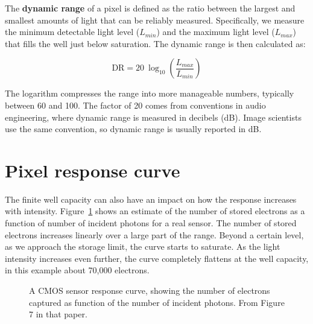\documentclass[
  letterpaper,
]{book}
\begin{document}
The \textbf{dynamic range} of a pixel is defined as the ratio between
the largest and smallest amounts of light that can be reliably measured.
Specifically, we measure the minimum detectable light level
(\(L_{min}\)) and the maximum light level (\(L_{max}\)) that fills the
well just below saturation. The dynamic range is then calculated as:

\[
\text{DR} = 20~\log_{10}\left(\frac{L_{max}}{L_{min}}\right)
\]

The logarithm compresses the range into more manageable numbers,
typically between 60 and 100. The factor of 20 comes from conventions in
audio engineering, where dynamic range is measured in decibels (dB).
Image scientists use the same convention, so dynamic range is usually
reported in dB.

\section{Pixel response curve}\label{sec-pixel-responsecurve}

The finite well capacity can also have an impact on how the response
increases with intensity. Figure~\ref{fig-sensor-linearity} shows an
estimate of the number of stored electrons as a function of number of
incident photons for a real sensor. The number of stored electrons
increases linearly over a large part of the range. Beyond a certain
level, as we approach the storage limit, the curve starts to saturate.
As the light intensity increases even further, the curve completely
flattens at the well capacity, in this example about 70,000 electrons.

\begin{figure}


\caption{\label{fig-sensor-linearity}A CMOS sensor response curve,
showing the number of electrons captured as function of the number of
incident photons. From Figure 7 in that paper.}

\end{figure}%
\end{document}
